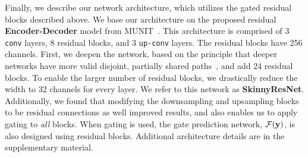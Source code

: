 Finally, we describe our network architecture, which utilizes the gated residual blocks described above.
We base our architecture on the proposed residual \textbf{Encoder-Decoder} model from MUNIT~\cite{huang2018multimodal}.
This architecture is comprised of 3 \texttt{conv} layers, 8 residual blocks, and 3 \texttt{up-conv} layers. The residual blocks have 256 channels. 
First, we deepen the network, based on the principle that deeper networks have more valid disjoint, partially shared paths~\cite{veit2016residual}, and add 24 residual blocks. 
To enable the larger number of residual blocks, we drastically reduce the width to 32 channels for every layer. 
We refer to this network as \textbf{SkinnyResNet}. 
Additionally, we found that modifying the downsampling and upsampling blocks to be residual connections as well improved results, and also enables us to apply gating to {\em all} blocks. 
When gating is used, the gate prediction network, $\mathcal{F} ({\bf y})$,  
is also designed using residual blocks. Additional architecture details are in the supplementary material. 





